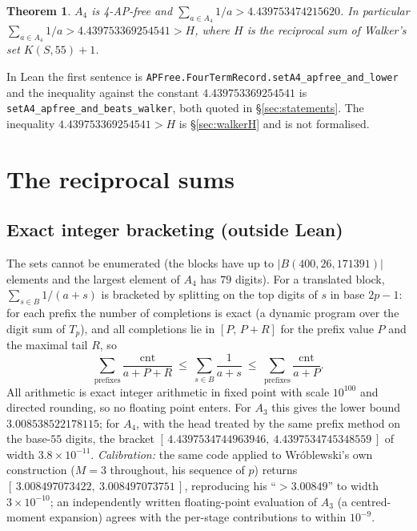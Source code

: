 \documentclass[11pt,a4paper]{article}
\newtheorem{theorem}{Theorem}[section]
\theoremstyle{definition}
\theoremstyle{remark}
\newcommand{\Blk}{B}
\newcommand{\code}[1]{\texttt{#1}}
\begin{document}
\begin{theorem}\label{thm:A4}
$A_4$ is 4-AP-free and $\sum_{a \in A_4} 1/a > 4.439753474215620$. In particular $\sum_{a \in A_4} 1/a > 4.439753369254541 > H$, where $H$ is the reciprocal sum of Walker's set $K(S,55)+1$.
\end{theorem}

In Lean the first sentence is \code{APFree.\allowbreak{}FourTermRecord.\allowbreak{}setA4\_\allowbreak{}apfree\_\allowbreak{}and\_\allowbreak{}lower} and the inequality against the constant $4.439753369254541$ is \code{setA4\_\allowbreak{}apfree\_\allowbreak{}and\_\allowbreak{}beats\_\allowbreak{}walker}, both quoted in \S\ref{sec:statements}. The inequality $4.439753369254541 > H$ is \S\ref{sec:walkerH} and is not formalised.

\section{The reciprocal sums}\label{sec:sum}

\subsection{Exact integer bracketing (outside Lean)}\label{sec:exact}

The sets cannot be enumerated (the blocks have up to $|\Blk(400,26,171391)|$ elements and the largest element of $A_4$ has $79$ digits). For a translated block, $\sum_{s\in\Blk}1/(a+s)$ is bracketed by splitting on the top digits of $s$ in base $2p-1$: for each prefix the number of completions is exact (a dynamic program over the digit sum of $T_p$), and all completions lie in $[P,\,P+R]$ for the prefix value $P$ and the maximal tail $R$, so
\[
\sum_{\text{prefixes}}\frac{\mathrm{cnt}}{a+P+R}\ \le\ \sum_{s\in\Blk}\frac1{a+s}\ \le\ \sum_{\text{prefixes}}\frac{\mathrm{cnt}}{a+P}.
\]
All arithmetic is exact integer arithmetic in fixed point with scale $10^{100}$ and directed rounding, so no floating point enters. For $A_3$ this gives the lower bound $3.008538522178115$; for $A_4$, with the head treated by the same prefix method on the base-$55$ digits, the bracket $[\,4.4397534744963946,\ 4.4397534745348559\,]$ of width $3.8 \times 10^{-11}$. \emph{Calibration:} the same code applied to Wr\'oblewski's own construction ($M=3$ throughout, his sequence of $p$) returns $[\,3.008497073422,\ 3.008497073751\,]$, reproducing his ``$>3.00849$'' to width $3\times10^{-10}$; an independently written floating-point evaluation of $A_3$ (a centred-moment expansion) agrees with the per-stage contributions to within $10^{-9}$.
\end{document}
